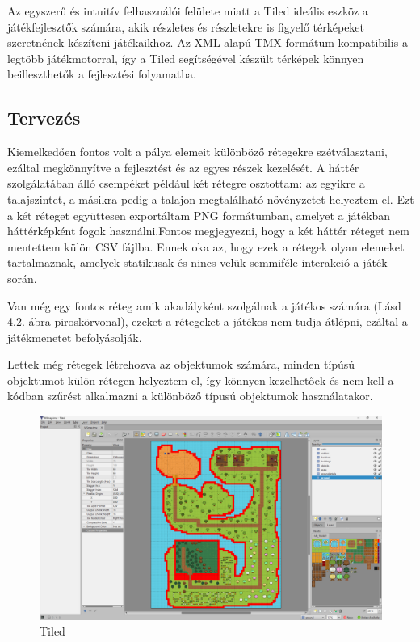 Az egyszerű és intuitív felhasználói felülete miatt a Tiled ideális eszköz a játékfejlesztők számára, akik részletes és részletekre is figyelő térképeket szeretnének készíteni játékaikhoz. Az XML alapú TMX formátum kompatibilis a legtöbb játékmotorral, így a Tiled segítségével készült térképek könnyen beilleszthetők a fejlesztési folyamatba.


\subsection{Tervezés}

Kiemelkedően fontos volt a pálya elemeit különböző rétegekre szétválasztani, ezáltal megkönnyítve a fejlesztést és az egyes részek kezelését. A háttér szolgálatában álló csempéket például két rétegre osztottam: az egyikre a talajszintet, a másikra pedig a talajon megtalálható növényzetet helyeztem el. Ezt a két réteget együttesen exportáltam PNG formátumban, amelyet a játékban háttérképként fogok használni.Fontos megjegyezni, hogy a két háttér réteget nem mentettem külön CSV fájlba. Ennek oka az, hogy ezek a rétegek olyan elemeket tartalmaznak, amelyek statikusak és nincs velük semmiféle interakció a játék során. 

Van még egy fontos réteg amik akadályként szolgálnak a játékos számára (Lásd 4.2. ábra piroskörvonal), ezeket a rétegeket a játékos nem tudja átlépni, ezáltal a játékmenetet befolyásolják.  

Lettek még rétegek létrehozva az objektumok számára, minden típúsú objektumot külön rétegen helyeztem el, így könnyen kezelhetőek és nem kell a kódban szűrést alkalmazni a különböző típusú objektumok használatakor.

\begin{figure}[H]
    \centering
    \includegraphics[width=14.0truecm]{images/Tiled.png}
    \caption{Tiled}
    \label{fig:Tiled}
\end{figure}




